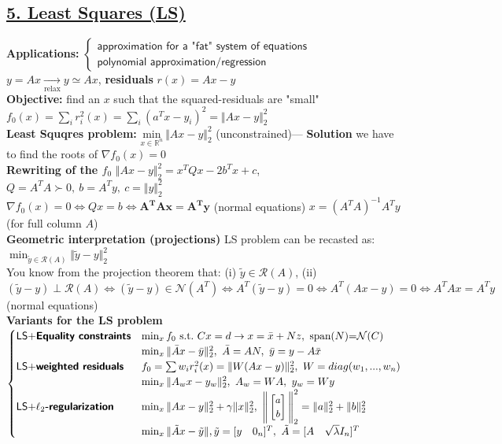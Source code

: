\documentclass[a4paper]{article}
\begin{document}
\subsection*{\underline{5. Least Squares (LS)}}
\textbf{Applications:} $\begin{cases}
    \textsf{approximation for a "fat" system of equations}\\
    \textsf{polynomial approximation/regression}
\end{cases}$ {\large{$y = Ax \underset{\text{relax}}{\longrightarrow} y \simeq Ax$}},  \textbf{residuals} $r(x) = Ax-y$\\
\textbf{Objective:} find an $x$ such that the squared-residuals are "small" 
$f_0(x) = \sum_i {r_i^2(x)} =\sum_i {(a^T x - y_i)^2} = \Vert Ax-y \Vert_2^2$\\
\textbf{Least Squqres problem: }    $\underset{x\in\mathbb{R}^n}{\text{min}} \ {\Vert Ax-y \Vert_2^2}$ (unconstrained)--- 
\textbf{Solution} we have to find the roots of $\nabla{f_0}(x)=0$\\
\textbf{Rewriting of the $f_0$} $\Vert Ax-y \Vert_2^2 = x^T{Q}x-2b^T{x}+c$, $Q=A^T A\succ0, \ b=A^T y, \ c=\Vert{y}\Vert_2^2$\\
$\nabla{f_0}(x)=0\iff Qx=b\iff \mathbf{A^T A x = A^T y}$ (normal equations) $x=(A^T A)^{-1} A^T y$ (for full column $A$)\\
\textbf{Geometric interpretation (projections)} LS problem can be recasted as: $\min_{\tilde{y}\in\mathcal{R}(A)}{\Vert \tilde{y} - y \Vert_2^2}$\\
You know from the projection theorem that: (i) $\tilde{y}\in\mathcal{R}(A)$, (ii) $(\tilde{y}-y) \perp \mathcal{R}(A) \iff (\tilde{y}-y)\in \mathcal{N}(A^T)\iff A^T{(\tilde{y}-y)}=0 \iff A^T{(Ax-y)}=0  \iff A^T A x = A^T y$ (normal equations)\\
\textbf{Variants for the LS problem} $\begin{cases}
    \textsf{LS+\textbf{Equality constraints}}& \min_x {f_0} \ \text{s.t.} \  Cx=d \to x=\bar{x}+Nz, \  \text{span($N$)=$\mathcal{N}(C)$}\\
     & \min_x {\Vert \bar{A}x-\bar{y}\Vert_2^2}, \ \bar{A}=AN,  \ \bar{y}=y-A\bar{x}\\
    \textsf{LS+\textbf{weighted residuals}}& f_0=\sum w_i r_i^2(x) = \Vert W(Ax-y) \Vert_2^2, \ W=diag(w_1,...,w_n)\\
     & \min_x \Vert A_w x -y_w \Vert_2^2, \ A_w = WA, \ y_w = Wy\\
    \textsf{LS+\textbf{$\ell_2$-regularization}}&\min_{x} {\Vert Ax-y \Vert_2^2} + \gamma\Vert x \Vert_2^2, \ 
    {\small \Bigg\Vert 
        \begin{bmatrix}
            a\\b
        \end{bmatrix}
     \Bigg\Vert}_2^2 = \Vert a \Vert_2^2 + \Vert b \Vert_2^2\\
      & \min_x {\Vert{\tilde{A}x-\tilde{y}}\Vert}, \tilde{y} = [y\quad{0_n}]^T, \ \tilde{A} = [A\quad \sqrt{\lambda}{I_n}]^T
\end{cases}$
\end{document}
